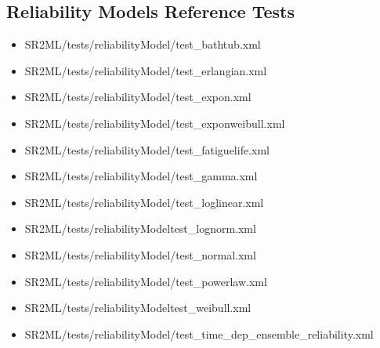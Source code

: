 \subsection{Reliability Models Reference Tests}
\begin{itemize}
	\item SR2ML/tests/reliabilityModel/test\_bathtub.xml
  \item SR2ML/tests/reliabilityModel/test\_erlangian.xml
	\item SR2ML/tests/reliabilityModel/test\_expon.xml
  \item SR2ML/tests/reliabilityModel/test\_exponweibull.xml
	\item SR2ML/tests/reliabilityModel/test\_fatiguelife.xml
  \item SR2ML/tests/reliabilityModel/test\_gamma.xml
	\item SR2ML/tests/reliabilityModel/test\_loglinear.xml
  \item SR2ML/tests/reliabilityModeltest\_lognorm.xml
	\item SR2ML/tests/reliabilityModel/test\_normal.xml
  \item SR2ML/tests/reliabilityModel/test\_powerlaw.xml
	\item SR2ML/tests/reliabilityModeltest\_weibull.xml
	\item SR2ML/tests/reliabilityModel/test\_time\_dep\_ensemble\_reliability.xml
\end{itemize}
